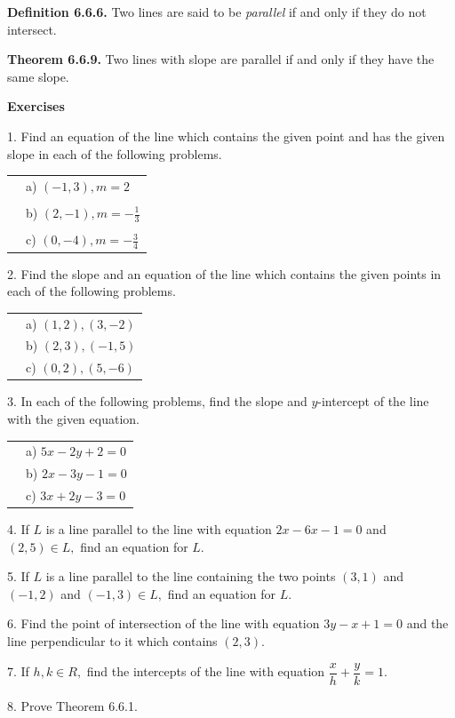 \textbf{Definition 6.6.6.} Two lines are said to be \textit{parallel} if and only if they do not intersect.\nl

\textbf{Theorem 6.6.9.} Two lines with slope are parallel if and only if they have the same slope.\nl

\textbf{Exercises}\nl

1. Find an equation of the line which contains the given point and
has the given slope in each of the following problems. \nl

\newpage
\begin{tabular}{r l}
&a) $(-1,3), m = 2$\\
&\\
&b) $(2, -1), m = -\frac{1}{3} $\\
&\\
&c) $(0, -4), m = -\frac{3}{4}$\\
\end{tabular}\nl

2. 	Find the slope and an equation of the line which contains the given
points in each of the following problems. \nl
\begin{tabular}{r l}
&a) $(1,2), (3,-2)$\\
&b) $(2,3), (-1,5)$ \\
&c) $(0,2), (5,-6)$ \\
\end{tabular}\nl

3. 	In each of the following problems, find the slope and $y$-intercept
of the line with the given equation. \nl
\begin{tabular}{r l}
&a) $5x - 2y + 2 = 0$\\
&b) $2x - 3y - 1 = 0$\\
&c) $3x + 2y - 3 = 0$\\
\end{tabular}\nl


4. If $L$ is a line parallel to the line with equation $2x - 6x - 1 = 0$ and $(2,5)\in L,$ find an equation for $L.$\nl

5. If $L$ is a line parallel to the line containing the two points $(3,1)$ and $(-1,2)$ and $(-1,3)\in L,$ find an equation for $L.$\nl

6. Find the point of intersection of the line with equation $3y - x + 1 = 0$ and the line perpendicular to it which contains $(2,3).$\nl

7. 	If $h,k\in R,$ find the intercepts of the line with equation $\dfrac{x}{h} + \dfrac{y}{k} = 1.$\nl

8. Prove Theorem 6.6.1. \nl


